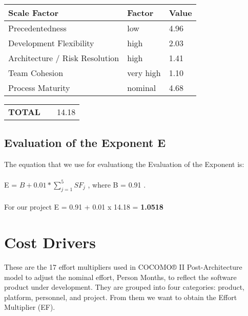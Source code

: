 \begin{center}
  \begin{tabular}{ l | l | l }%
   	\hline
	\textbf{Scale Factor} & \textbf{Factor} & \textbf{Value}
   	\\ \hline
    Precedentedness & low & 4.96
    \\\hline
    Development Flexibility & high & 2.03
    \\\hline
    Architecture / Risk Resolution & high & 1.41
    \\\hline
    Team Cohesion & very high & 1.10
 	\\\hline
 	Process Maturity & nominal & 4.68
   	\\\hline 
  \end{tabular}
  \begin{tabular}{ l l | l }%
   	\\\textbf{TOTAL} & & 14.18
  \end{tabular}
\end{center}

\subsection{Evaluation of the Exponent E}
The equation that we use for evaluationg the Evaluation of the Exponent is:
\\\\E = $B + 0.01 * \sum_{j=1}^{5} SF_j$ , where B = 0.91 .
\\\\For our project E = 0.91 + 0.01 x 14.18 = \textbf{1.0518}

\newpage %
\section{Cost Drivers}
These are the 17 effort multipliers used in COCOMO® II Post-Architecture model to adjust the nominal effort, Person Months, to reflect the software product under development. They are grouped into four categories: product, platform, personnel, and project. From them we want to obtain the Effort Multiplier (EF).

